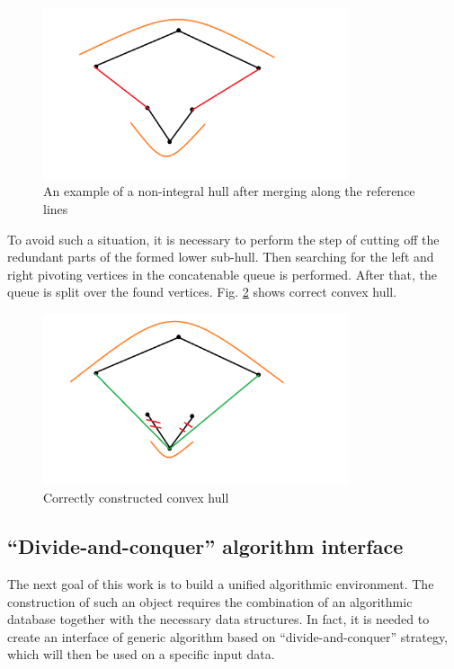 \documentclass[a4paper,english,numberwithinsect,notab]{eurocg20-submission}
\begin{document}
	\begin{figure}[t]
		\centering
		\includegraphics[width=0.8\textwidth, height=0.3\textheight]{incorect_lower_subhull}
		\caption{An example of a non-integral hull after merging along the reference lines}
		\label{fig:incorect_lower_subhull}
	\end{figure}
	
	To avoid such a situation, it is necessary to perform the step of cutting off the redundant parts of the formed lower sub-hull. Then searching for the left and right pivoting vertices in the concatenable queue is performed. After that, the queue is split over the found vertices. Fig. \ref{fig:correct_convex_hull} shows correct convex hull.
	
	\begin{figure}[t]
		\centering
		\includegraphics[width=0.8\textwidth, height=0.3\textheight]{correct_convex_hull}
		\caption{Correctly constructed convex hull}
		\label{fig:correct_convex_hull}
	\end{figure}



\subsection{``Divide-and-conquer'' algorithm interface}


	The next goal of this work is to build a unified algorithmic environment. The construction of such an object requires the combination of an algorithmic database together with the necessary data structures.  In fact, it is needed to create an interface of generic algorithm based on ``divide-and-conquer'' strategy, which will then be used on a specific input data.
	
\end{document}
